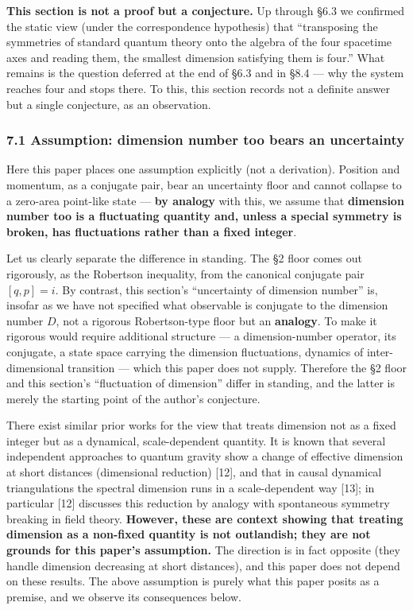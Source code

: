 \documentclass[
]{article}
\begin{document}
\textbf{This section is not a proof but a conjecture.} Up through §6.3
we confirmed the static view (under the correspondence hypothesis) that
``transposing the symmetries of standard quantum theory onto the algebra
of the four spacetime axes and reading them, the smallest dimension
satisfying them is four.'' What remains is the question deferred at the
end of §6.3 and in §8.4 --- why the system reaches four and stops there.
To this, this section records not a definite answer but a single
conjecture, as an observation.

\subsubsection{7.1 Assumption: dimension number too bears an
uncertainty}\label{assumption-dimension-number-too-bears-an-uncertainty}

Here this paper places one assumption explicitly (not a derivation).
Position and momentum, as a conjugate pair, bear an uncertainty floor
and cannot collapse to a zero-area point-like state --- \textbf{by
analogy} with this, we assume that \textbf{dimension number too is a
fluctuating quantity and, unless a special symmetry is broken, has
fluctuations rather than a fixed integer}.

Let us clearly separate the difference in standing. The §2 floor comes
out rigorously, as the Robertson inequality, from the canonical
conjugate pair \([q,p]=i\). By contrast, this section's ``uncertainty of
dimension number'' is, insofar as we have not specified what observable
is conjugate to the dimension number \(D\), not a rigorous
Robertson-type floor but an \textbf{analogy}. To make it rigorous would
require additional structure --- a dimension-number operator, its
conjugate, a state space carrying the dimension fluctuations, dynamics
of inter-dimensional transition --- which this paper does not supply.
Therefore the §2 floor and this section's ``fluctuation of dimension''
differ in standing, and the latter is merely the starting point of the
author's conjecture.

There exist similar prior works for the view that treats dimension not
as a fixed integer but as a dynamical, scale-dependent quantity. It is
known that several independent approaches to quantum gravity show a
change of effective dimension at short distances (dimensional reduction)
{[}12{]}, and that in causal dynamical triangulations the spectral
dimension runs in a scale-dependent way {[}13{]}; in particular {[}12{]}
discusses this reduction by analogy with spontaneous symmetry breaking
in field theory. \textbf{However, these are context showing that
treating dimension as a non-fixed quantity is not outlandish; they are
not grounds for this paper's assumption.} The direction is in fact
opposite (they handle dimension decreasing at short distances), and this
paper does not depend on these results. The above assumption is purely
what this paper posits as a premise, and we observe its consequences
below.
\end{document}
